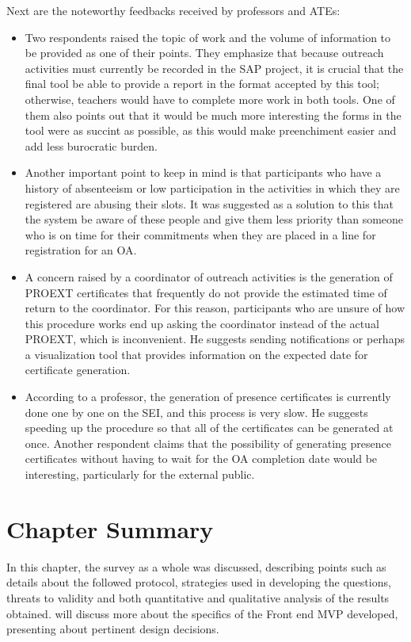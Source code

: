 Next are the noteworthy feedbacks received by professors and \acp{ATE}:
\begin{itemize}
  \item Two respondents raised the topic of work and the volume of information to be provided as one of their points. They emphasize that because outreach activities must currently be recorded in the \ac{SAP} project, it is crucial that the final tool be able to provide a report in the format accepted by this tool; otherwise, teachers would have to complete more work in both tools. One of them also points out that it would be much more interesting the forms in the tool were as succint as possible, as this would make preenchiment easier and add less burocratic burden.
  \item Another important point to keep in mind is that participants who have a history of absenteeism or low participation in the activities in which they are registered are abusing their slots. It was suggested as a solution to this that the system be aware of these people and give them less priority than someone who is on time for their commitments when they are placed in a line for registration for an \ac{OA}.
  \item A concern raised by a coordinator of outreach activities is the generation of \ac{PROEXT} certificates that frequently do not provide the estimated time of return to the coordinator. For this reason, participants who are unsure of how this procedure works end up asking the coordinator instead of the actual \ac{PROEXT}, which is inconvenient. He suggests sending notifications or perhaps a visualization tool that provides information on the expected date for certificate generation.
  \item According to a professor, the generation of presence certificates is currently done one by one on the \ac{SEI}, and this process is very slow. He suggests speeding up the procedure so that all of the certificates can be generated at once. Another respondent claims that the possibility of generating presence certificates without having to wait for the \ac{OA} completion date would be interesting, particularly for the external public.
\end{itemize}

\section{Chapter Summary}\label{survey:chapter-summary}

In this chapter, the survey as a whole was discussed, describing points such as details about the followed protocol, strategies used in developing the questions, threats to validity and both quantitative and qualitative analysis of the results obtained.  will discuss more about the specifics of the Front end \ac{MVP} developed, presenting about pertinent design decisions.